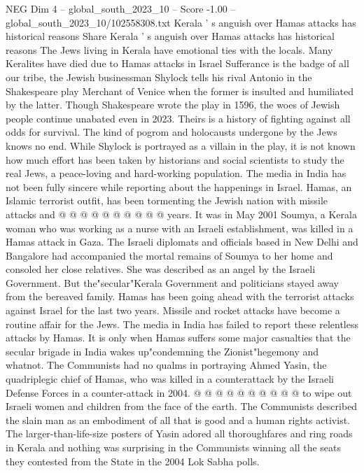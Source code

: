 \begin{textsample}{NEG Dim 4 – global\_south\_2023\_10 – Score -1.00 – global\_south\_2023\_10/102558308.txt}  \label{ex:f4_neg_021}
Kerala ' s anguish over Hamas attacks has historical reasons Share Kerala ' s anguish over Hamas attacks has historical reasons The Jews living in Kerala have emotional ties with the locals.
Many Keralites have died due to Hamas attacks in Israel Sufferance is the badge of all our tribe, the Jewish businessman Shylock tells his rival Antonio in the Shakespeare play Merchant of Venice when the former is insulted and humiliated by the latter.
Though Shakespeare wrote the play in 1596, the woes of Jewish people continue unabated even in 2023.
Theirs is a history of fighting against all odds for survival.
The kind of pogrom and holocausts undergone by the Jews knows no end.
While Shylock is portrayed as a villain in the play, it is not known how much effort has been taken by historians and social scientists to study the real Jews, a peace-loving and hard-working population.
The media in India has not been fully sincere while reporting about the happenings in Israel.
Hamas, an Islamic terrorist outfit, has been tormenting the Jewish nation with missile attacks and @ @ @ @ @ @ @ @ @ @ years.
It was in May 2001 Soumya, a Kerala woman who was working as a nurse with an Israeli establishment, was killed in a Hamas attack in Gaza.
The Israeli diplomats and officials based in New Delhi and Bangalore had accompanied the mortal remains of Soumya to her home and consoled her close relatives.
She was described as an angel by the Israeli Government.
But the"secular"Kerala Government and politicians stayed away from the bereaved family.
Hamas has been going ahead with the terrorist attacks against Israel for the last two years.
Missile and rocket attacks have become a routine affair for the Jews.
The media in India has failed to report these relentless attacks by Hamas.
It is only when Hamas suffers some major casualties that the secular brigade in India wakes up"condemning the Zionist"hegemony and whatnot.
The Communists had no qualms in portraying Ahmed Yasin, the quadriplegic chief of Hamas, who was killed in a counterattack by the Israeli Defense Forces in a counter-attack in 2004. @ @ @ @ @ @ @ @ @ @ to wipe out Israeli women and children from the face of the earth.
The Communists described the slain man as an embodiment of all that is good and a human rights activist.
The larger-than-life-size posters of Yasin adored all thoroughfares and ring roads in Kerala and nothing was surprising in the Communists winning all the seats they contested from the State in the 2004 Lok Sabha polls.

\end{textsample}
